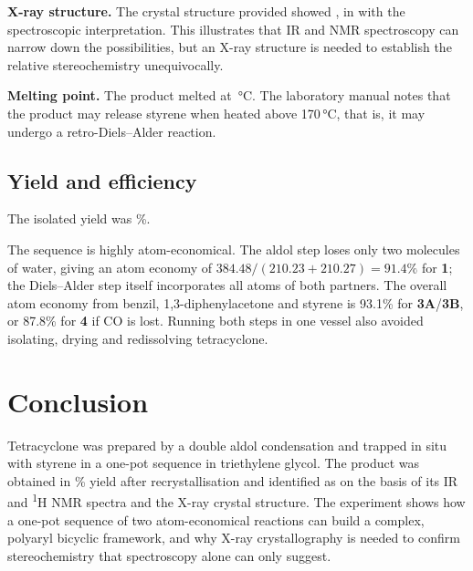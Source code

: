 \documentclass[11pt,a4paper]{article}
\begin{document}
\textbf{X-ray structure.} The crystal structure provided showed , in  with the spectroscopic interpretation. This illustrates that IR and NMR spectroscopy can narrow down the possibilities, but an X-ray structure is needed to establish the relative stereochemistry unequivocally.\cite{Hoang2015}

\textbf{Melting point.} The product melted at \,\si{\celsius}. The laboratory manual notes that the product may release styrene when heated above 170\,\si{\celsius},\cite{Manual2026} that is, it may undergo a retro-Diels--Alder reaction. 

\subsection{Yield and efficiency}
The isolated yield was \%. 

The sequence is highly atom-economical. The aldol step loses only two molecules of water, giving an atom economy of $384.48/(210.23+210.27) = 91.4\%$ for \textbf{1}; the Diels--Alder step itself incorporates all atoms of both partners. The overall atom economy from benzil, 1,3-diphenylacetone and styrene is 93.1\% for \textbf{3A}/\textbf{3B}, or 87.8\% for \textbf{4} if CO is lost.\cite{Trost1991} Running both steps in one vessel also avoided isolating, drying and redissolving tetracyclone.

\section{Conclusion}
Tetracyclone was prepared by a double aldol condensation and trapped in situ with styrene in a one-pot sequence in triethylene glycol. The product was obtained in \% yield after recrystallisation and identified as  on the basis of its IR and \textsuperscript{1}H NMR spectra and the X-ray crystal structure. The experiment shows how a one-pot sequence of two atom-economical reactions can build a complex, polyaryl bicyclic framework, and why X-ray crystallography is needed to confirm stereochemistry that spectroscopy alone can only suggest.
\end{document}
